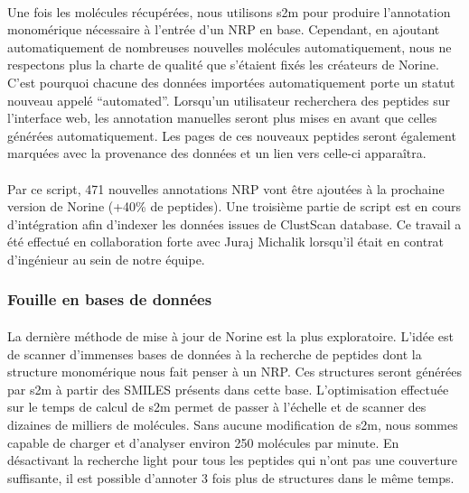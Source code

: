 \documentclass[12pt,french,twoside]{report}
\begin{document}
\paragraph{}Une fois les molécules récupérées, nous utilisons s2m pour produire l'annotation monomérique nécessaire à l'entrée d'un NRP en base.
Cependant, en ajoutant automatiquement de nombreuses nouvelles molécules automatiquement, nous ne respectons plus la charte de qualité que s'étaient fixés les créateurs de Norine.
C'est pourquoi chacune des données importées automatiquement porte un statut nouveau appelé ``automated''.
Lorsqu'un utilisateur recherchera des peptides sur l'interface web, les annotation manuelles seront plus mises en avant que celles générées automatiquement.
Les pages de ces nouveaux peptides seront également marquées avec la provenance des données et un lien vers celle-ci apparaîtra.

\paragraph{}Par ce script, 471 nouvelles annotations NRP vont être ajoutées à la prochaine version de Norine (+40\% de peptides).
Une troisième partie de script est en cours d'intégration afin d'indexer les données issues de ClustScan database.
Ce travail a été effectué en collaboration forte avec Juraj Michalik lorsqu'il était en contrat d'ingénieur au sein de notre équipe.



\subsubsection{Fouille en bases de données}

\paragraph{}La dernière méthode de mise à jour de Norine est la plus exploratoire.
L'idée est de scanner d'immenses bases de données à la recherche de peptides dont la structure monomérique nous fait penser à un NRP.
Ces structures seront générées par s2m à partir des SMILES présents dans cette base.
L'optimisation effectuée sur le temps de calcul de s2m permet de passer à l'échelle et de scanner des dizaines de milliers de molécules.
Sans aucune modification de s2m, nous sommes capable de charger et d'analyser environ 250 molécules par minute.
En désactivant la recherche light pour tous les peptides qui n'ont pas une couverture suffisante, il est possible d'annoter 3 fois plus de structures dans le même temps.
\end{document}
